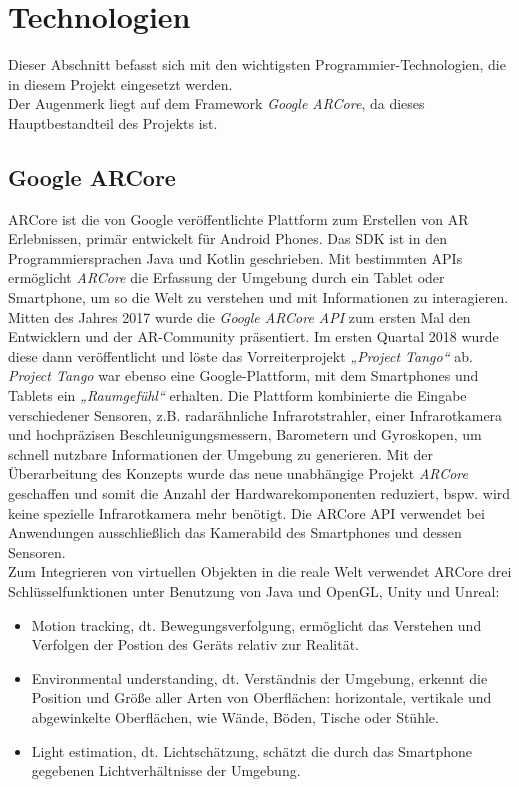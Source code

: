 \section{Technologien}
\label{chap:Technologien}
Dieser Abschnitt befasst sich mit den wichtigsten Programmier-Technologien, die in diesem Projekt eingesetzt werden. 
\\ 
Der Augenmerk liegt auf dem Framework \textit{Google ARCore}, da dieses Hauptbestandteil des Projekts ist. 
\subsection{Google ARCore}
ARCore ist die von Google veröffentlichte Plattform zum Erstellen von \acl{AR} Erlebnissen, primär entwickelt für Android Phones. 
Das \ac{SDK} ist in den Programmiersprachen Java und Kotlin geschrieben. Mit bestimmten \acs{API}s ermöglicht \textit{ARCore} die Erfassung 
der Umgebung durch ein Tablet oder Smartphone, um so die Welt zu verstehen und mit Informationen zu interagieren. Mitten des Jahres 2017 
wurde die \textit{Google ARCore API} zum ersten Mal den Entwicklern und der \acs{AR}-Community präsentiert. Im ersten Quartal 2018 wurde 
diese dann veröffentlicht und löste das Vorreiterprojekt \textit{„Project Tango“} ab. 
\\ 
\linebreak 
\textit{Project Tango} war ebenso eine Google-Plattform, mit dem Smartphones und Tablets ein \textit{„Raumgefühl“} erhalten. \cite{projecttango.2016j} 
Die Plattform kombinierte die Eingabe verschiedener Sensoren, z.B. radarähnliche Infrarotstrahler, einer Infrarotkamera und hochpräzisen 
Beschleunigungsmessern, Barometern und Gyroskopen, um schnell nutzbare Informationen der Umgebung zu generieren. Mit der Überarbeitung des 
Konzepts wurde das neue unabhängige Projekt \textit{ARCore} geschaffen und somit die Anzahl der Hardwarekomponenten reduziert, bspw. wird 
keine spezielle Infrarotkamera mehr benötigt. Die ARCore \acs{API} verwendet bei Anwendungen ausschließlich das Kamerabild des Smartphones und 
dessen Sensoren. 
\\ 
\linebreak 
Zum Integrieren von virtuellen Objekten in die reale Welt verwendet ARCore drei Schlüsselfunktionen unter Benutzung von Java und OpenGL, Unity 
und Unreal:
\begin{itemize}
    \item Motion tracking, dt. Bewegungsverfolgung, ermöglicht das Verstehen und Verfolgen der Postion des Geräts relativ zur Realität.
    \item Environmental understanding, dt. Verständnis der Umgebung, erkennt die Position und Größe aller Arten von Oberflächen: horizontale, 
    vertikale und abgewinkelte Oberflächen, wie Wände, Böden, Tische oder Stühle.
    \item Light estimation, dt. Lichtschätzung, schätzt die durch das Smartphone gegebenen Lichtverhältnisse der Umgebung. \cite{arcorefundamentals.2018m}
\end{itemize}
